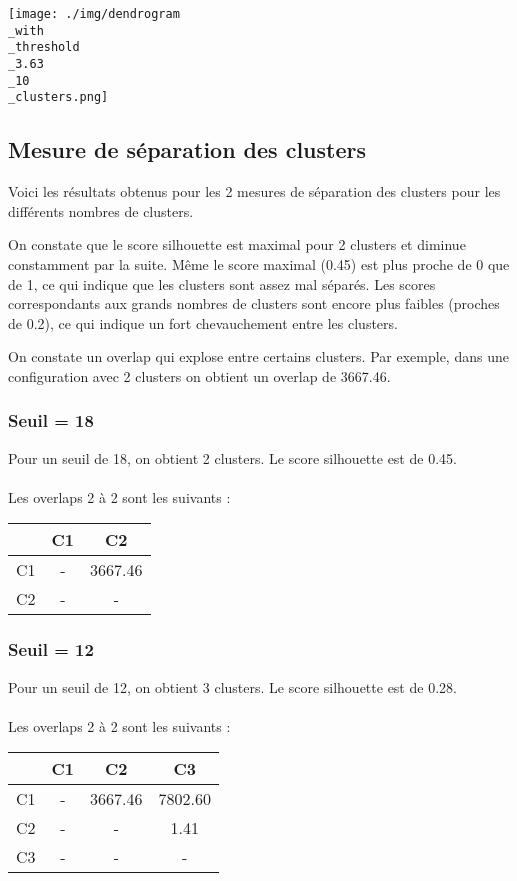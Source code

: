 \documentclass{article}
\begin{document}
\begin{center}
    \texttt{[image: ./img/dendrogram\\\_with\\\_threshold\\\_3.63\\\_10\\\_clusters.png]}
\end{center}


\subsection*{Mesure de séparation des clusters}
Voici les résultats obtenus pour les 2 mesures de séparation des clusters
pour les différents nombres de clusters.

On constate que le score silhouette est maximal pour 2 clusters et
diminue constamment par la suite. Même le score maximal (0.45) 
est plus proche de 0 que de 1,
ce qui indique que les clusters sont assez mal séparés. Les scores
correspondants aux grands nombres de clusters sont encore plus faibles
(proches de 0.2), ce qui indique un fort chevauchement entre les clusters.

On constate un overlap qui explose entre certains clusters. Par exemple,
dans une configuration avec 2 clusters on obtient un overlap de 3667.46.
\subsubsection*{Seuil = 18}
Pour un seuil de 18, on obtient 2 clusters. Le score silhouette est de 0.45.\\\\
Les overlaps 2 à 2 sont les suivants :\\

\begin{tabular}{|c|c|c|}
\hline
& C1 & C2 \\
\hline
C1 & - & 3667.46 \\
\hline
C2 & - & - \\
\hline
\end{tabular}

\subsubsection*{Seuil = 12}
Pour un seuil de 12, on obtient 3 clusters. Le score silhouette est de 0.28.\\\\
Les overlaps 2 à 2 sont les suivants :\\

\begin{tabular}{|c|c|c|c|}
\hline
& C1 & C2 & C3 \\
\hline
C1 & - & 3667.46 & 7802.60 \\
\hline
C2 & - & - & 1.41 \\
\hline
C3 & - & - & - \\
\hline
\end{tabular}
\end{document}
